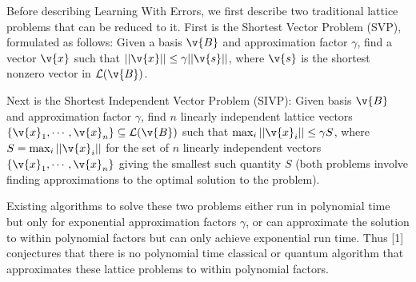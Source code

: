 Before describing Learning With Errors, we first describe two traditional
lattice problems that can be reduced to it.
First is the Shortest Vector Problem (SVP), formulated as follows:
Given a basis $\v{B}$ and approximation factor $\gamma$, find a vector 
$\v{x}$ such that $||\v{x}|| \leq \gamma||\v{s}||$, where $\v{s}$ is
the shortest nonzero vector in $\mathcal{L}(\v{B})$.

Next is the Shortest Independent Vector Problem (SIVP): Given basis
$\v{B}$ and approximation factor $\gamma$, find $n$ linearly 
independent lattice vectors $\{\v{x}_1, \cdots, \v{x}_n\} \subseteq
\mathcal{L}(\v{B})$ such that $\max_i{||\v{x}_i||} \leq \gamma S$,
where $S = \max_i{||\v{x}_i||}$ for the set of $n$ linearly independent
vectors $\{\v{x}_1,\cdots,\v{x}_n\}$ giving the smallest such quantity $S$ (both problems involve finding approximations to the optimal
solution to the problem).

Existing algorithms to solve these two problems either run in polynomial time but only for exponential approximation factors $\gamma$, or can
approximate the solution to within polynomial factors but can only
achieve exponential run time. Thus [1] conjectures that there is no 
polynomial time classical or quantum algorithm that approximates these
lattice problems to within polynomial factors.
